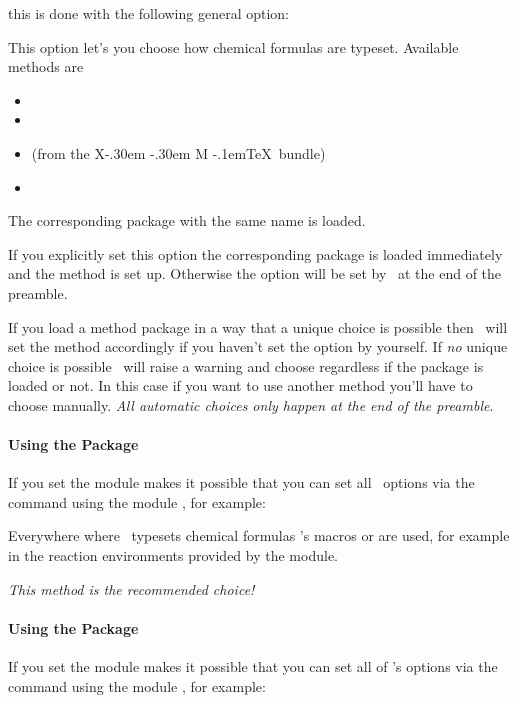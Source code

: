 \documentclass{chemmacros-manual}
\providecommand*\XyM{%
  X\kern-.30em
  \smash{\raise.50ex\hbox{\char'7}}%
  \kern-.30em M%
}
\providecommand*\XyMTeX{\XyM\kern-.1em\TeX}
\def\chemmodule*#1{\textquotedblleft#1\textquotedblright}%
\begin{document}
this is done with the following general option:
\begin{options}
    This option let's you choose how chemical formulas are
    typeset.  Available methods are
    \begin{itemize}
      \item {}
      \item {}
      \item {} (from the \XyMTeX\ bundle)
      \item {}
    \end{itemize}
    The corresponding package with the same name is loaded.
\end{options}
If you explicitly set this option the corresponding package is loaded
immediately and the method is set up.  Otherwise the option will be set by
\chemmacros\ at the end of the preamble.

If you load a method package in a way that a unique choice
is possible then \chemmacros\ will set the method accordingly if you haven't
set the option by yourself.  If \emph{no} unique choice is possible
\chemmacros\ will raise a warning and choose  regardless if
the package is loaded or not.  In this case if you want to use another method
you'll have to choose manually. \emph{All automatic choices only happen at the
  end of the preamble}.

\paragraph{Using the  Package}
If you set  the  module
makes it possible that you can set all \chemformula\ options via the
 command using the module , for example:
\begin{sourcecode}
\end{sourcecode}

Everywhere where \chemmacros\ typesets chemical formulas \chemformula's macros
 or  are used, for example in the reaction environments
provided by the  module.

\emph{This method is the recommended choice!}

\paragraph{Using the  Package}\label{sec:using-mhchem}
If you set  the  module makes
it possible that you can set all of 's options via the
 command using the module , for example:
\begin{sourcecode}
\end{sourcecode}
\end{document}
